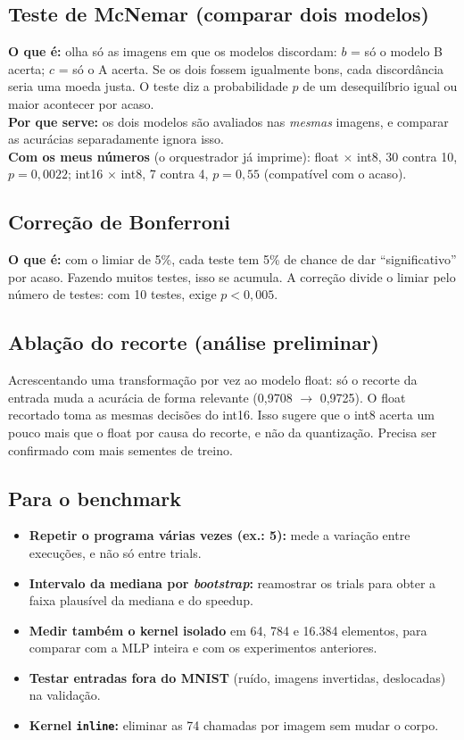 \documentclass[10pt]{article}
\begin{document}
\subsection{Teste de McNemar (comparar dois modelos)}
\textbf{O que é:} olha só as imagens em que os modelos discordam: $b$ = só o modelo B acerta;
$c$ = só o A acerta. Se os dois fossem igualmente bons, cada discordância seria uma moeda
justa. O teste diz a probabilidade $p$ de um desequilíbrio igual ou maior acontecer por acaso.\\
\textbf{Por que serve:} os dois modelos são avaliados nas \emph{mesmas} imagens, e comparar as
acurácias separadamente ignora isso.\\
\textbf{Com os meus números} (o orquestrador já imprime): float $\times$ int8, 30 contra 10,
$p=0{,}0022$; int16 $\times$ int8, 7 contra 4, $p=0{,}55$ (compatível com o acaso).

\subsection{Correção de Bonferroni}
\textbf{O que é:} com o limiar de 5\%, cada teste tem 5\% de chance de dar ``significativo'' por
acaso. Fazendo muitos testes, isso se acumula. A correção divide o limiar pelo número de testes: com
10 testes, exige $p<0{,}005$.

\subsection{Ablação do recorte (análise preliminar)}
Acrescentando uma transformação por vez ao modelo float: só o recorte da entrada muda a acurácia de
forma relevante (0,9708 $\to$ 0,9725). O float recortado toma as mesmas decisões do int16. Isso
sugere que o int8 acerta um pouco mais que o float por causa do recorte, e não da quantização.
Precisa ser confirmado com mais sementes de treino.

\subsection{Para o benchmark}
\begin{itemize}
\item \textbf{Repetir o programa várias vezes (ex.: 5):} mede a variação entre execuções, e não só
      entre trials.
\item \textbf{Intervalo da mediana por \emph{bootstrap}:} reamostrar os trials para obter a faixa
      plausível da mediana e do speedup.
\item \textbf{Medir também o kernel isolado} em 64, 784 e 16.384 elementos, para comparar com a MLP
      inteira e com os experimentos anteriores.
\item \textbf{Testar entradas fora do MNIST} (ruído, imagens invertidas, deslocadas) na validação.
\item \textbf{Kernel \texttt{inline}:} eliminar as 74 chamadas por imagem sem mudar o corpo.
\end{itemize}
\end{document}
